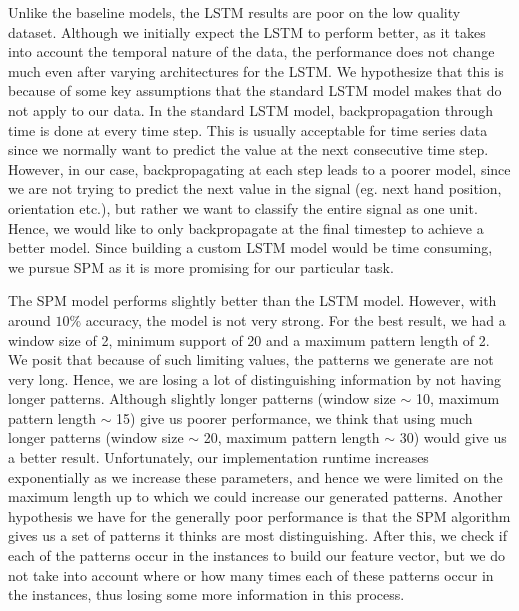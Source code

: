 \documentclass[twocolumn]{article}
\begin{document}
Unlike the baseline models, the LSTM results are poor on the low quality dataset. Although we initially expect the LSTM to perform better, as it takes into account the temporal nature of the data, the performance does not change much even after varying architectures for the LSTM. We hypothesize that this is because of some key assumptions that the standard LSTM model makes that do not apply to our data. In the standard LSTM model, backpropagation through time is done at every time step. This is usually acceptable for time series data since we normally want to predict the value at the next consecutive time step. However, in our case, backpropagating at each step leads to a poorer model, since we are not trying to predict the next value in the signal (eg. next hand position, orientation etc.), but rather we want to classify the entire signal as one unit. Hence, we would like to only backpropagate at the final timestep to achieve a better model. Since building a custom LSTM model would be time consuming, we pursue SPM as it is more promising for our particular task.

The SPM model performs slightly better than the LSTM model. However, with around $10\%$ accuracy, the model is not very strong. For the best result, we had a window size of 2, minimum support of 20 and a maximum pattern length of 2. We posit that because of such limiting values, the patterns we generate are not very long. Hence, we are losing a lot of distinguishing information by not having longer patterns. Although slightly longer patterns (window size $\sim$ 10, maximum pattern length $\sim$ 15) give us poorer performance, we think that using much longer patterns (window size $\sim$ 20, maximum pattern length $\sim$ 30) would give us a better result. Unfortunately, our implementation runtime increases exponentially as we increase these parameters, and hence we were limited on the maximum length up to which we could increase our generated patterns. Another hypothesis we have for the generally poor performance is that the SPM algorithm gives us a set of patterns it thinks are most distinguishing. After this, we check if each of the patterns occur in the instances to build our feature vector, but we do not take into account where or how many times each of these patterns occur in the instances, thus losing some more information in this process.
\end{document}
